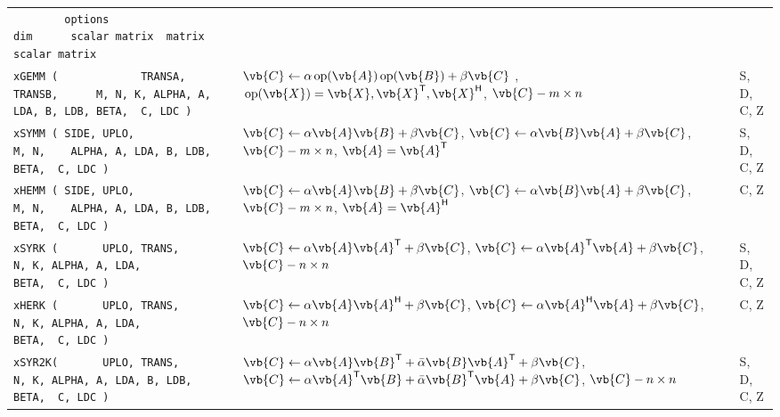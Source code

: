 \documentclass[10pt,a3paper, landscape]{article}
\newcommand{\T}{\mathsf{T}}
\renewcommand{\H}{\mathsf{H}}
\renewcommand{\op}{\,\mathrm{op}}
\begin{document}
\begin{tabular}{lll}
		\verb|        options                          dim      scalar matrix  matrix  scalar matrix   | &                                                                                                                                                                                                                                                              &                    \\
		\verb|xGEMM (             TRANSA, TRANSB,      M, N, K, ALPHA, A, LDA, B, LDB, BETA,  C, LDC ) | & $\vb{C} \gets \alpha \op(\vb{A})\op(\vb{B})                             + \beta \vb{C} $                                                                    , $\op(\vb{X}) = \vb{X}, \vb{X}^{\T}, \vb{X}^{\H}$, $\vb{C} - m \times n$                        & S, D, C, Z         \\
		\verb|xSYMM ( SIDE, UPLO,                      M, N,    ALPHA, A, LDA, B, LDB, BETA,  C, LDC ) | & $\vb{C} \gets \alpha \vb{A}    \vb{B}                                 + \beta \vb{C} $, $\vb{C} \gets \alpha  \vb{B}   \vb{A}                                 + \beta \vb{C} $,                        $\vb{C} - m \times n$, $\vb{A}=\vb{A}^{\T}$           & S, D, C, Z         \\
		\verb|xHEMM ( SIDE, UPLO,                      M, N,    ALPHA, A, LDA, B, LDB, BETA,  C, LDC ) | & $\vb{C} \gets \alpha \vb{A}    \vb{B}                                 + \beta \vb{C} $, $\vb{C} \gets \alpha  \vb{B}   \vb{A}                                 + \beta \vb{C} $,                        $\vb{C} - m \times n$, $\vb{A}=\vb{A}^{\H}$           & C, Z               \\
		\verb|xSYRK (       UPLO, TRANS,                  N, K, ALPHA, A, LDA,         BETA,  C, LDC ) | & $\vb{C} \gets \alpha \vb{A}    \vb{A}^{\T}                               + \beta \vb{C} $, $\vb{C} \gets \alpha  \vb{A}^{\T} \vb{A}                                 + \beta \vb{C} $,                        $\vb{C} - n \times n$                           & S, D, C, Z         \\
		\verb|xHERK (       UPLO, TRANS,                  N, K, ALPHA, A, LDA,         BETA,  C, LDC ) | & $\vb{C} \gets \alpha \vb{A}    \vb{A}^{\H}                               + \beta \vb{C} $, $\vb{C} \gets \alpha  \vb{A}^{\H} \vb{A}                                 + \beta \vb{C} $,                        $\vb{C} - n \times n$                           & C, Z               \\
		\verb|xSYR2K(       UPLO, TRANS,                  N, K, ALPHA, A, LDA, B, LDB, BETA,  C, LDC ) | & $\vb{C} \gets \alpha \vb{A}    \vb{B}^{\T}      +   \bar{\alpha} \vb{B} \vb{A}^{\T}   + \beta \vb{C} $, $\vb{C} \gets \alpha \vb{A}^{\T}    \vb{B}      +   \bar{\alpha} \vb{B}^{\T} \vb{A}   + \beta \vb{C} $,                        $\vb{C} - n \times n$ & S, D, C, Z         \\

\end{tabular}
\end{document}
